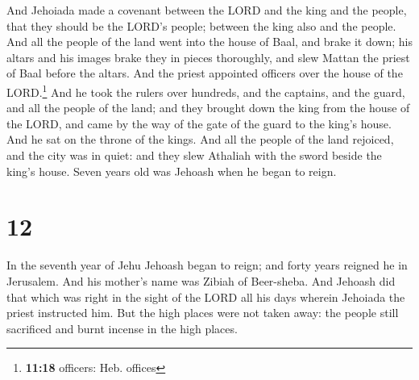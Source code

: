  And Jehoiada made a covenant between the LORD and the
king and the people, that they should be the LORD's people; between the
king also and the people.  And all the people of the land
went into the house of Baal, and brake it down; his altars and his
images brake they in pieces thoroughly, and slew Mattan the priest of
Baal before the altars. And the priest appointed officers over the house
of the LORD.\footnote{\textbf{11:18} officers: Heb. offices}
 And he took the rulers over hundreds, and the captains,
and the guard, and all the people of the land; and they brought down the
king from the house of the LORD, and came by the way of the gate of the
guard to the king's house. And he sat on the throne of the kings.
 And all the people of the land rejoiced, and the city
was in quiet: and they slew Athaliah with the sword beside the king's
house.  Seven years old was Jehoash when he began to
reign.

\hypertarget{section-11}{%
\section{12}\label{section-11}}

 In the seventh year of Jehu Jehoash began to reign; and
forty years reigned he in Jerusalem. And his mother's name was Zibiah of
Beer-sheba.  And Jehoash did that which was right in the
sight of the LORD all his days wherein Jehoiada the priest instructed
him.  But the high places were not taken away: the people
still sacrificed and burnt incense in the high places.

